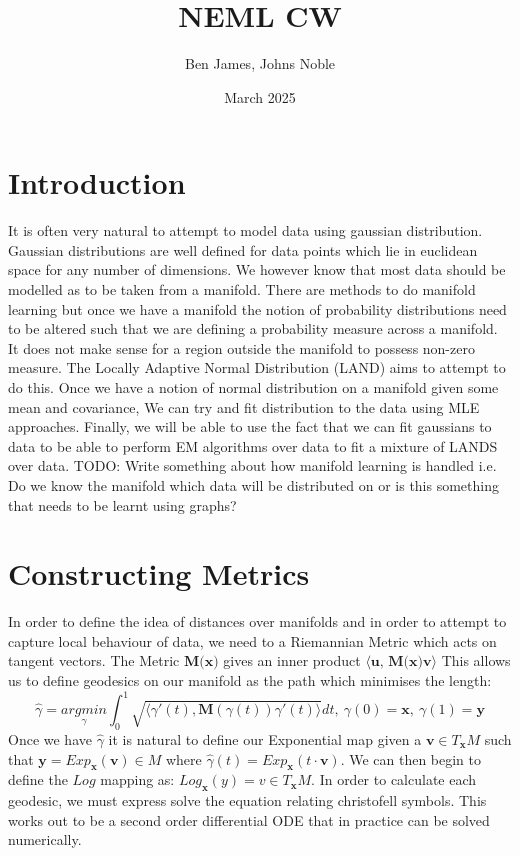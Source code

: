 \documentclass{article}
\title{NEML CW}
\author{Ben James, Johns Noble}
\date{March 2025}
\begin{document}
\maketitle
\tableofcontents
\section{Introduction}
It is often very natural to attempt to model data using gaussian distribution. 
Gaussian distributions are well defined for data points which lie in euclidean space for any number of dimensions.
We however know that most data should be modelled as to be taken from a manifold.
There are methods to do manifold learning but once we have a manifold the notion of probability distributions need to be altered such that we are defining a probability measure across a manifold.
It does not make sense for a region outside the manifold to possess non-zero measure.
The Locally Adaptive Normal Distribution (LAND) aims to attempt to do this.
Once we have a notion of normal distribution on a manifold given some mean and covariance, We can try and fit distribution to the data using MLE approaches.
Finally, we will be able to use the fact that we can fit gaussians to data to be able to perform EM algorithms over data to fit a mixture of LANDS over data.
TODO: Write something about how manifold learning is handled i.e. Do we know the manifold which data will be distributed on or is this something that needs to be learnt using graphs?
\section{Constructing Metrics}
In order to define the idea of distances over manifolds and in order to attempt to capture local behaviour of data, we need to a Riemannian Metric which acts on tangent vectors.
The Metric $\textbf{M(x)}$ gives an inner product $\langle \textbf{u, M(x)v}\rangle$
This allows us to define geodesics on our manifold as the path which minimises the length:
$$\hat{\gamma} = \underset{\gamma}{argmin} \int_0^1\sqrt{\langle \gamma'(t),\textbf{M}(\gamma(t))
\gamma'(t)\rangle}dt,\: \gamma(0)=\textbf{x},\:\gamma(1)=\textbf{y}$$
Once we have $\hat{\gamma}$ it is natural to define our Exponential map given a $\textbf{v}\in T_\textbf{x}M$ such that $\textbf{y} =Exp_\textbf{x}(\textbf{v}) \in M$ where $\hat{\gamma}(t) = Exp_\textbf{x}(t\cdot\textbf{v})$.
We can then begin to define the $Log$ mapping as: $Log_\textbf{x}(y)=v\in T_\textbf{x}M$.
In order to calculate each geodesic, we must express solve the equation relating christofell symbols.
This works out to be a second order differential ODE that in practice can be solved numerically.
\end{document}
